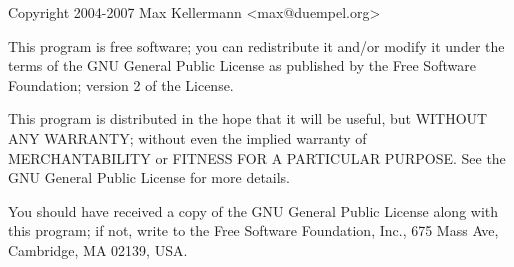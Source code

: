 \documentclass{article}
\begin{document}
Copyright 2004-2007 Max Kellermann <max@duempel.org>

This program is free software; you can redistribute it and/or modify
it under the terms of the GNU General Public License as published by
the Free Software Foundation; version 2 of the License.

This program is distributed in the hope that it will be useful, but
WITHOUT ANY WARRANTY; without even the implied warranty of
MERCHANTABILITY or FITNESS FOR A PARTICULAR PURPOSE.  See the GNU
General Public License for more details.

You should have received a copy of the GNU General Public License
along with this program; if not, write to the Free Software
Foundation, Inc., 675 Mass Ave, Cambridge, MA 02139, USA.
\end{document}

